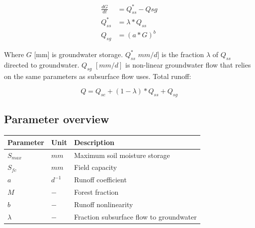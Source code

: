 \begin{align}
	\frac{dG}{dt} &= Q_{ss}^* - Q{sg} \\
	Q_{ss}^* &= \lambda*Q_{ss} \\
	Q_{sg} &= (a*G)^b
\end{align}

Where $G$ [mm] is groundwater storage. $Q_{ss}^*$ $mm/d]$ is the fraction $\lambda$ of $Q_{ss}$ directed to groundwater. $Q_{sg}$ $[mm/d]$ is non-linear groundwater flow that relies on the same parameters as subsurface flow uses. Total runoff:

\begin{equation}
	Q = Q_{se} + (1-\lambda)*Q_{ss} + Q_{sg}
\end{equation}


\subsection{Parameter overview}
\begin{table}[htbp]
  \centering
    \begin{tabular}{lll}
    \toprule
    Parameter & Unit  & Description \\
    \midrule
    $S_{max}$ & $mm$  & Maximum soil moisture storage \\
    $S_{fc}$ & $mm$  & Field capacity \\
    $a$   & $d^{-1}$ & Runoff coefficient \\
    $M$   & $-$   & Forest fraction \\
    $b$   & $-$   & Runoff nonlinearity \\
    $\lambda$ & $-$   & Fraction subsurface flow to groundwater \\
    \bottomrule
    \end{tabular}%
  \label{tab:addlabel}%
\end{table}%
